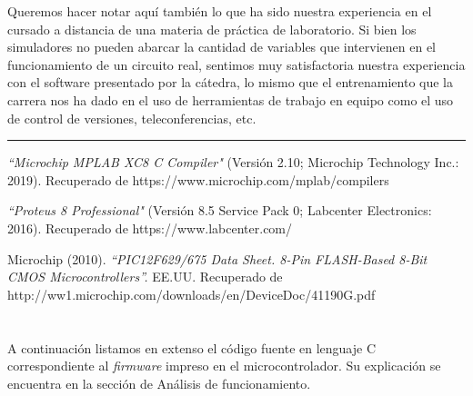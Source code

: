 ﻿\documentclass[a4paper]{article}
\let\originalappendix\appendix
\renewcommand{\appendix}{%
    \newpage\originalappendix\pagenumbering{gobble}%
    \renewcommand\thesection{Anexo \Alph{section}}
    \setcounter{secnumdepth}{1}
}
\begin{document}
Queremos hacer notar aquí también lo que ha sido nuestra 
experiencia en el cursado a distancia de una materia de
práctica de laboratorio. Si bien los simuladores no pueden
abarcar la cantidad de variables que intervienen en el 
funcionamiento de un circuito real, sentimos muy 
satisfactoria nuestra experiencia con el software 
presentado por la cátedra, lo mismo que el entrenamiento 
que la carrera nos ha dado en el uso de herramientas de 
trabajo en equipo como el uso de control de versiones, 
teleconferencias, etc.

\noindent\rule{\textwidth}{1pt}

\begin{thebibliography}{9}

\textit{``Microchip MPLAB XC8 C Compiler"}
(Versión 2.10; Microchip Technology Inc.: 2019).
Recuperado de https://www.microchip.com/mplab/compilers

\textit{``Proteus 8 Professional"} 
(Versión 8.5 Service Pack 0; Labcenter Electronics: 2016).
Recuperado de https://www.labcenter.com/

Microchip (2010).
\textit{``PIC12F629/675 Data Sheet. 8-Pin FLASH-Based 8-Bit CMOS 
Microcontrollers''.}
EE.UU. Recuperado de 
http://ww1.microchip.com/downloads/en/DeviceDoc/41190G.pdf

\end{thebibliography}


\appendix

\section{}
A continuación listamos en extenso el código fuente en lenguaje 
C correspondiente al \textit{firmware} impreso en el 
microcontrolador. Su explicación se encuentra en la sección de 
Análisis de funcionamiento.


\end{document}
